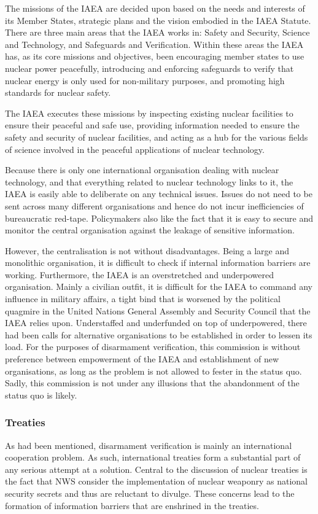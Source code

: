 \documentclass[twoside,titlepage,11pt,twocolumn,a4paper]{article}
\begin{document}
The missions of the IAEA are decided upon based on the needs and
interests of its Member States, strategic plans and the vision
embodied in the IAEA Statute. There are three main areas that the IAEA
works in: Safety and Security, Science and Technology, and Safeguards
and Verification. Within these areas the IAEA has, as its core
missions and objectives, been encouraging member states to use nuclear
power peacefully, introducing and enforcing safeguards to verify that
nuclear energy is only used for non-military purposes, and promoting
high standards for nuclear safety.

The IAEA executes these missions by inspecting existing nuclear
facilities to ensure their peaceful and safe use, providing
information needed to ensure the safety and security of nuclear
facilities, and acting as a hub for the various fields of science
involved in the peaceful applications of nuclear technology.

Because there is only one international organisation dealing with
nuclear technology, and that everything related to nuclear technology
links to it, the IAEA is easily able to deliberate on any technical
issues. Issues do not need to be sent across many different
organisations and hence do not incur inefficiencies of bureaucratic
red-tape. Policymakers also like the fact that it is easy to secure
and monitor the central organisation against the leakage of sensitive
information.

However, the centralisation is not without disadvantages. Being a
large and monolithic organisation, it is difficult to check if
internal information barriers are working. Furthermore, the IAEA is an
overstretched and underpowered organisation. Mainly a civilian outfit,
it is difficult for the IAEA to command any influence in military
affairs, a tight bind that is worsened by the political quagmire in
the United Nations General Assembly and Security Council that the IAEA
relies upon. Understaffed and underfunded on top of underpowered,
there had been calls for alternative organisations to be established
in order to lessen its load. For the purposes of disarmament
verification, this commission is without preference between
empowerment of the IAEA and establishment of new organisations, as
long as the problem is not allowed to fester in the status quo. Sadly,
this commission is not under any illusions that the abandonment of the
status quo is likely.

\subsubsection{Treaties}
As had been mentioned, disarmament verification is mainly an
international cooperation problem. As such, international treaties
form a substantial part of any serious attempt at a solution. Central
to the discussion of nuclear treaties is the fact that NWS consider
the implementation of nuclear weaponry as national security secrets
and thus are reluctant to divulge. These concerns lead to the
formation of information barriers that are enshrined in the treaties.
\end{document}
